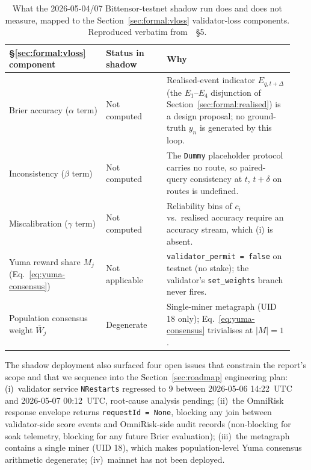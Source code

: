 \documentclass[11pt,a4paper]{article}
\begin{document}
\begin{table}[h]
\centering
\small
\begin{tabular}{p{0.32\linewidth}p{0.20\linewidth}p{0.42\linewidth}}
\toprule
\textbf{§\ref{sec:formal:vloss} component} & \textbf{Status in shadow} &
\textbf{Why} \\
\midrule
Brier accuracy ($\alpha$ term) & Not computed & Realised-event indicator
$E_{q, t+\Delta}$ (the $E_1$--$E_4$ disjunction of
Section~\ref{sec:formal:realised}) is a design proposal; no ground-truth $y_n$ is
generated by this loop. \\
Inconsistency ($\beta$ term) & Not computed & The \texttt{Dummy} placeholder protocol
carries no route, so paired-query consistency at $t$, $t + \delta$ on routes is
undefined. \\
Miscalibration ($\gamma$ term) & Not computed & Reliability bins of $c_i$ vs.\
realised accuracy require an accuracy stream, which (i) is absent. \\
Yuma reward share $M_j$ (Eq.~\ref{eq:yuma-consensus}) & Not applicable &
\texttt{validator\_permit = false} on testnet (no stake); the validator's
\texttt{set\_weights} branch never fires. \\
Population consensus weight $\overline{W}_j$ & Degenerate & Single-miner metagraph
(UID 18 only); Eq.~\eqref{eq:yuma-consensus} trivialises at $|M| = 1$. \\
\bottomrule
\end{tabular}
\caption{What the 2026-05-04/07 Bittensor-testnet shadow run does and does not
measure, mapped to the Section~\ref{sec:formal:vloss} validator-loss components.
Reproduced verbatim from~\cite{omnirisk2026soak}~\S5.}
\label{tab:soak-deferred}
\end{table}

The shadow deployment also surfaced four open issues that constrain the report's
scope and that we sequence into the Section~\ref{sec:roadmap} engineering plan:
(i)~validator service \texttt{NRestarts} regressed to 9 between 2026-05-06
14:22~UTC and 2026-05-07 00:12~UTC, root-cause analysis pending; (ii)~the
OmniRisk response envelope returns \texttt{requestId = None}, blocking any join
between validator-side score events and OmniRisk-side audit records (non-blocking
for soak telemetry, blocking for any future Brier evaluation); (iii)~the metagraph
contains a single miner (UID 18), which makes population-level Yuma consensus
arithmetic degenerate; (iv)~mainnet has not been deployed.
\end{document}
